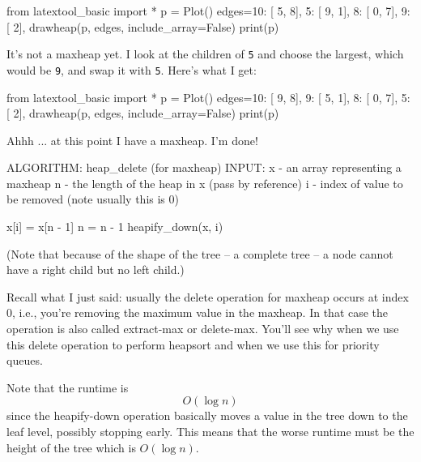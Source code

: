 \begin{python}
from latextool_basic import *
p = Plot()
edges={10: [ 5, 8],
        5: [ 9, 1],
        8: [ 0, 7],
        9: [ 2],
      }
drawheap(p, edges, include_array=False)
print(p)
\end{python}

It's not a maxheap yet.
I look at the children of \texttt{5} and choose the largest,
which would be \texttt{9}, and swap it with \texttt{5}.
Here's what I get:

\begin{python}
from latextool_basic import *
p = Plot()
edges={10: [ 9, 8],
        9: [ 5, 1],
        8: [ 0, 7],
        5: [ 2],
      }
drawheap(p, edges, include_array=False)
print(p)
\end{python}

Ahhh ... at this point I have a maxheap.
I'm done!

\begin{console}[commandchars=\\\{\}]
ALGORITHM: heap_delete (for maxheap)
INPUT: x - an array representing a maxheap
       n - the length of the heap in x (pass by reference)
       i - index of value to be removed (note usually
           this is 0)

x[i] = x[n - 1]
n = n - 1
heapify_down(x, i)
\end{console}

(Note that because of the shape of the tree -- a complete tree --
a node cannot have a right child but no left child.)

Recall what I just said: usually the delete operation for maxheap
occurs at index 0, i.e., you're removing the maximum value in the maxheap.
In that case the operation is also called extract-max or delete-max.
You'll see why when we use this delete operation to perform heapsort
and when we use this for priority queues.

Note that the runtime is
\[
O(\log n)
\]
since the heapify-down operation basically moves
a value in the tree down to the leaf level, possibly stopping
early.
This means that the worse runtime must be
the height of the tree which is $O(\log n)$.

